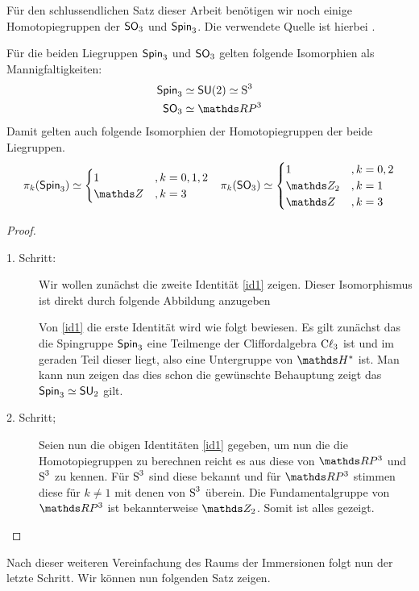 Für den schlussendlichen Satz dieser Arbeit benötigen wir
noch einige Homotopiegruppen der $\so{3}$ und $\spin{3}$. Die
verwendete Quelle ist hierbei \cite{BHMMM15}.
\begin{Lem}\label{hgroups}
	Für die beiden Liegruppen $\spin{3}$ und $\so{3}$ gelten
	folgende Isomorphien als Mannigfaltigkeiten:
	\begin{align}
	\spin{3} &\simeq \su(2) \simeq \S^3 \label{{id1}}\\
	\so{3} &\simeq \RP^3 \label{id2}
	\end{align}
	Damit gelten auch folgende Isomorphien der Homotopiegruppen
	der beide Liegruppen.
	\begin{align*}
	\pi_k(\spin{3}) &\simeq \begin{cases}
	1 & ,k=0,1,2 \\
	\Z & ,k=3
	\end{cases}
	&{\pi_k(\so{3}) \simeq \begin{cases}
		1 & ,k=0,2 \\
		\Z_2 & ,k=1 \\
		\Z & ,k=3
		\end{cases}}
	\end{align*}
	
	\begin{proof}
		\begin{description}
			\item[1. Schritt:] Wir wollen zunächst die zweite Identität \cref{id1} zeigen. Dieser Isomorphismus
			ist direkt durch folgende Abbildung anzugeben
			
			Von \cref{id1} die erste Identität wird wie folgt bewiesen.
			Es gilt zunächst das die Spingruppe $ \spin{3} $ 
			eine Teilmenge der Cliffordalgebra $ \Cl_3 $ ist und
			im geraden Teil dieser liegt, also eine Untergruppe 
			von $ \H^\ast $ ist. Man kann nun zeigen das dies
			schon die gewünschte Behauptung zeigt das $ \spin{3} \simeq \su_2 $ gilt.
			
			\item[2. Schritt;] Seien nun die obigen Identitäten \ref{id1}  gegeben, um nun die
			die Homotopiegruppen zu berechnen reicht es aus
			diese von $\RP^3$ und $ \S^3 $ zu kennen. Für $ \S^3 $
			sind diese bekannt und für $ \RP^3 $ stimmen diese
			für $ k \neq 1 $ mit denen von $ \S^3 $ überein. Die
			Fundamentalgruppe von $ \RP^3 $ ist bekannterweise $ \Z_2 $. Somit ist alles gezeigt.
		\end{description}
		
		
		
	\end{proof}
	
\end{Lem}

Nach dieser weiteren Vereinfachung des Raums der Immersionen folgt
nun der letzte Schritt. Wir können nun folgenden Satz zeigen.


